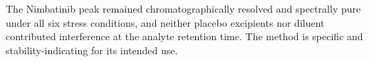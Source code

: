\begin{verdictbox}
The Nimbatinib peak remained chromatographically resolved and spectrally pure under all six
stress conditions, and neither placebo excipients nor diluent contributed interference at the
analyte retention time. The method is specific and stability-indicating for its intended use.
\end{verdictbox}
